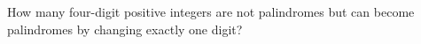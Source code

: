 How many four-digit positive integers are not palindromes but can become palindromes by changing exactly one digit?
